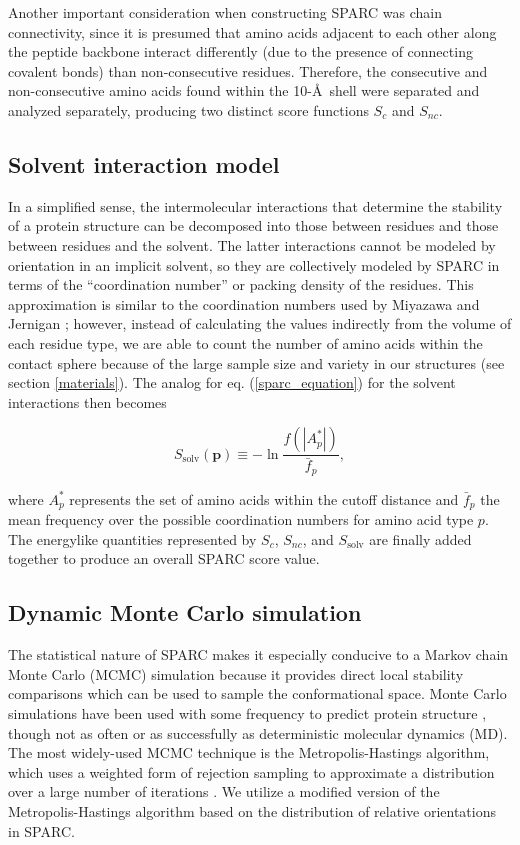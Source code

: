 \documentclass[11pt,twocolumn]{article}
\begin{document}
Another important consideration when constructing SPARC was chain connectivity, since it is presumed that amino acids adjacent to each other along the peptide backbone interact differently (due to the presence of connecting covalent bonds) than non-consecutive residues.
Therefore, the consecutive and non-consecutive amino acids found within the 10-\AA\, shell were separated and analyzed separately, producing two distinct score functions $S_c$ and $S_{nc}$.

\subsection{Solvent interaction model}
In a simplified sense, the intermolecular interactions that determine the stability of a protein structure can be decomposed into those between residues and those between residues and the solvent.
The latter interactions cannot be modeled by orientation in an implicit solvent, so they are collectively modeled by SPARC in terms of the ``coordination number'' or packing density of the residues.
This approximation is similar to the coordination numbers used by Miyazawa and Jernigan \cite{miyazawa}; however, instead of calculating the values indirectly from the volume of each residue type, we are able to count the number of amino acids within the contact sphere because of the large sample size and variety in our structures (see section \ref{materials}).
The analog for eq. (\ref{sparc_equation}) for the solvent interactions then becomes

\begin{equation}
S_{\text{solv}}(\textbf{p})\equiv -\ln{\frac{f(|A_p^*|)}{\bar{f}_p}},
\label{solvent_equation}
\end{equation}

where $A_p^*$ represents the set of amino acids within the cutoff distance and $\bar{f}_p$ the mean frequency over the possible coordination numbers for amino acid type $p$.
The energylike quantities represented by $S_c$, $S_{nc}$, and $S_\text{solv}$ are finally added together to produce an overall SPARC score value.

\subsection{Dynamic Monte Carlo simulation}
The statistical nature of SPARC makes it especially conducive to a Markov chain Monte Carlo (MCMC) simulation because it provides direct local stability comparisons which can be used to sample the conformational space.
Monte Carlo simulations have been used with some frequency to predict protein structure \cite{kolinski,enciso}, though not as often or as successfully as deterministic molecular dynamics (MD).
The most widely-used MCMC technique is the Metropolis-Hastings algorithm, which uses a weighted form of rejection sampling to approximate a distribution over a large number of iterations \cite{metropolis}.
We utilize a modified version of the Metropolis-Hastings algorithm based on the distribution of relative orientations in SPARC.
\end{document}
